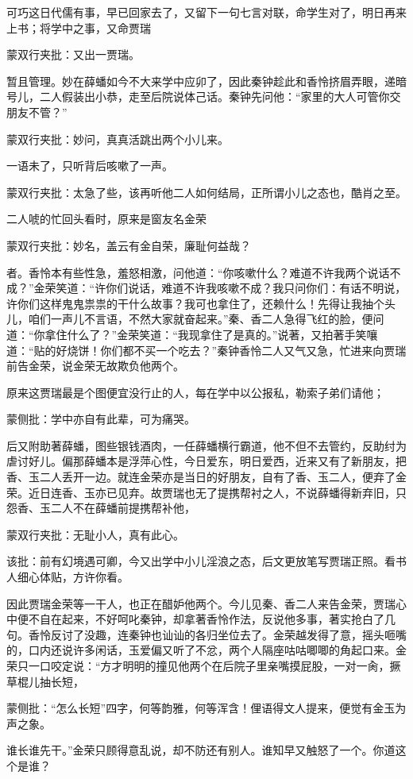 \begin{parag}
    可巧这日代儒有事，早已回家去了，又留下一句七言对联，命学生对了，明日再来上书；将学中之事，又命贾瑞\begin{note}蒙双行夹批：又出一贾瑞。\end{note}暂且管理。妙在薛蟠如今不大来学中应卯了，因此秦钟趁此和香怜挤眉弄眼，递暗号儿，二人假装出小恭，走至后院说体己话。秦钟先问他：“家里的大人可管你交朋友不管？”\begin{note}蒙双行夹批：妙问，真真活跳出两个小儿来。\end{note}一语未了，只听背后咳嗽了一声。\begin{note}蒙双行夹批：太急了些，该再听他二人如何结局，正所谓小儿之态也，酷肖之至。\end{note}二人唬的忙回头看时，原来是窗友名金荣\begin{note}蒙双行夹批：妙名，盖云有金自荣，廉耻何益哉？\end{note}者。香怜本有些性急，羞怒相激，问他道：“你咳嗽什么？难道不许我两个说话不成？”金荣笑道：“许你们说话，难道不许我咳嗽不成？我只问你们：有话不明说，许你们这样鬼鬼祟祟的干什么故事？我可也拿住了，还赖什么！先得让我抽个头儿，咱们一声儿不言语，不然大家就奋起来。”秦、香二人急得飞红的脸，便问道：“你拿住什么了？”金荣笑道：“我现拿住了是真的。”说著，又拍著手笑嚷道：“贴的好烧饼！你们都不买一个吃去？”秦钟香怜二人又气又急，忙进来向贾瑞前告金荣，说金荣无故欺负他两个。
\end{parag}


\begin{parag}
    原来这贾瑞最是个图便宜没行止的人，每在学中以公报私，勒索子弟们请他；\begin{note}蒙侧批：学中亦自有此辈，可为痛哭。\end{note}后又附助著薛蟠，图些银钱酒肉，一任薛蟠横行霸道，他不但不去管约，反助纣为虐讨好儿。偏那薛蟠本是浮萍心性，今日爱东，明日爱西，近来又有了新朋友，把香、玉二人丢开一边。就连金荣亦是当日的好朋友，自有了香、玉二人，便弃了金荣。近日连香、玉亦已见弃。故贾瑞也无了提携帮衬之人，不说薛蟠得新弃旧，只怨香、玉二人不在薛蟠前提携帮补他，\begin{note}蒙双行夹批：无耻小人，真有此心。\end{note}\begin{note}该批：前有幻境遇可卿，今又出学中小儿淫浪之态，后文更放笔写贾瑞正照。看书人细心体贴，方许你看。\end{note}因此贾瑞金荣等一干人，也正在醋妒他两个。今儿见秦、香二人来告金荣，贾瑞心中便不自在起来，不好呵叱秦钟，却拿著香怜作法，反说他多事，著实抢白了几句。香怜反讨了没趣，连秦钟也讪讪的各归坐位去了。金荣越发得了意，摇头咂嘴的，口内还说许多闲话，玉爱偏又听了不忿，两个人隔座咕咕唧唧的角起口来。金荣只一口咬定说：“方才明明的撞见他两个在后院子里亲嘴摸屁股，一对一肏，撅草棍儿抽长短，\begin{note}蒙侧批：“怎么长短”四字，何等韵雅，何等浑含！俚语得文人提来，便觉有金玉为声之象。\end{note}谁长谁先干。”金荣只顾得意乱说，却不防还有别人。谁知早又触怒了一个。你道这个是谁？
\end{parag}


